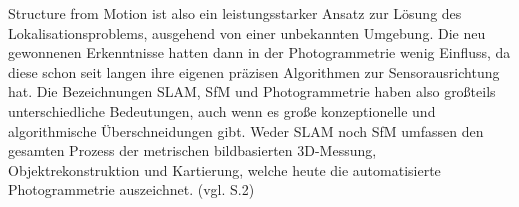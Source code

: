 Structure from Motion ist also ein leistungsstarker Ansatz zur Lösung des Lokalisationsproblems, ausgehend von einer unbekannten Umgebung. Die neu gewonnenen Erkenntnisse hatten dann in der Photogrammetrie wenig Einfluss, da diese schon seit langen ihre eigenen präzisen Algorithmen zur Sensorausrichtung hat. Die Bezeichnungen SLAM, SfM und Photogrammetrie haben also großteils unterschiedliche Bedeutungen, auch wenn es große konzeptionelle und algorithmische Überschneidungen gibt. Weder SLAM noch SfM umfassen den gesamten Prozess der metrischen bildbasierten 3D-Messung, Objektrekonstruktion und Kartierung, welche heute die automatisierte Photogrammetrie auszeichnet. (vgl. \cite{vergleich_fraser} S.2)



